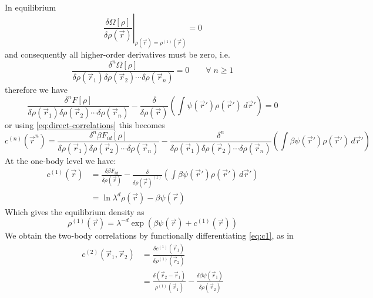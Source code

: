 In equilibrium
\begin{equation}
  \left.
  \frac{\delta \Omega[\rho]}{\delta\rho(\vec{r})}
  \right|_{\rho(\vec{r}) = \rho^{(1)}(\vec{r})}
  = 0
\end{equation}
and consequently all higher-order derivatives must be zero, i.e.\
\begin{equation}
  \frac{\delta^n \Omega[\rho]}{\delta\rho(\vec{r}_1) \delta\rho(\vec{r}_2) \cdots \delta\rho(\vec{r}_n)} = 0 \qquad \forall \; n \ge 1
\end{equation}
therefore we have
\begin{equation}
  \frac{\delta^n F[\rho]}{\delta \rho(\vec{r}_1) \delta \rho(\vec{r}_2) \cdots \delta \rho(\vec{r}_n)} -
  \frac{\delta}{\delta\rho(\vec{r})}
  \left(
  \int \psi(\vec{r}') \rho(\vec{r}') \, d\vec{r}'
  \right)
  = 0
\end{equation}
or using \eqref{eq:direct-correlations} this becomes
\begin{equation*}
  c^{(n)}(\vec{r}^n) =
  \frac{\delta^n \beta F_{id}[\rho]}{\delta \rho(\vec{r}_1) \delta \rho(\vec{r}_2) \cdots \delta \rho(\vec{r}_n)} -
  \frac{\delta^n}{\delta \rho(\vec{r}_1) \delta \rho(\vec{r}_2) \cdots \delta \rho(\vec{r}_n)}
  \left(
  \int \beta\psi(\vec{r}') \rho(\vec{r}') \, d\vec{r}'
  \right)
\end{equation*}
At the one-body level we have:
\begin{equation}\label{eq:c1}
  \begin{aligned}
    c^{(1)}(\vec{r}) &=
    \frac{\delta \beta F_{id}}{\delta \rho(\vec{r})} -
    \frac{\delta}{\delta \rho(\vec{r})^{(1)}}
    \left(
    \int \beta\psi(\vec{r}') \rho(\vec{r}') \, d\vec{r}'
    \right) \\
    &=
    \ln{\lambda^d \rho(\vec{r})} -
    \beta\psi(\vec{r})
  \end{aligned}
\end{equation}
Which gives the equilibrium density as
\begin{equation}
  \rho^{(1)}(\vec{r}) = \lambda^{-d} \exp{\left(\beta\psi(\vec{r}) + c^{(1)}(\vec{r})\right)}
\end{equation}
We obtain the two-body correlations by functionally differentiating \eqref{eq:c1}, as in
\begin{equation}\label{eq:c2}
  \begin{aligned}
    c^{(2)}(\vec{r}_1, \vec{r}_2) &=
    \frac{\delta c^{(1)}(\vec{r}_1)}{\delta \rho^{(1)}(\vec{r}_2)} \\
    &=
    \frac{\delta(\vec{r}_2 - \vec{r}_1)}{\rho^{(1)}(\vec{r}_1)} -
    \frac{\delta\beta\psi(\vec{r}_1)}{\delta \rho(\vec{r}_2)}
  \end{aligned}
\end{equation}
